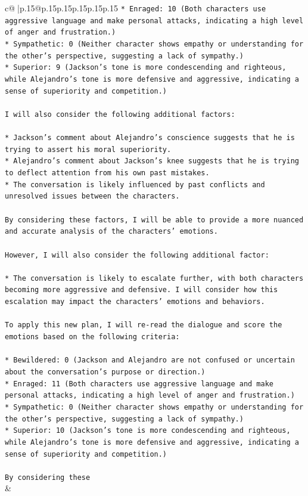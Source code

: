 \documentclass{article}
\begin{document}
{\begin{supertabular}{c@{$\;$}|p{.15\linewidth}@{}p{.15\linewidth}p{.15\linewidth}p{.15\linewidth}p{.15\linewidth}p{.15\linewidth}}
{{{\texttt{* Enraged: 10 (Both characters use aggressive language and make personal attacks, indicating a high level of anger and frustration.)} \\
\texttt{* Sympathetic: 0 (Neither character shows empathy or understanding for the other's perspective, suggesting a lack of sympathy.)} \\
\texttt{* Superior: 9 (Jackson's tone is more condescending and righteous, while Alejandro's tone is more defensive and aggressive, indicating a sense of superiority and competition.)} \\
\\ 
\texttt{I will also consider the following additional factors:} \\
\\ 
\texttt{* Jackson's comment about Alejandro's conscience suggests that he is trying to assert his moral superiority.} \\
\texttt{* Alejandro's comment about Jackson's knee suggests that he is trying to deflect attention from his own past mistakes.} \\
\texttt{* The conversation is likely influenced by past conflicts and unresolved issues between the characters.} \\
\\ 
\texttt{By considering these factors, I will be able to provide a more nuanced and accurate analysis of the characters' emotions.} \\
\\ 
\texttt{However, I will also consider the following additional factor:} \\
\\ 
\texttt{* The conversation is likely to escalate further, with both characters becoming more aggressive and defensive. I will consider how this escalation may impact the characters' emotions and behaviors.} \\
\\ 
\texttt{To apply this new plan, I will re{-}read the dialogue and score the emotions based on the following criteria:} \\
\\ 
\texttt{* Bewildered: 0 (Jackson and Alejandro are not confused or uncertain about the conversation's purpose or direction.)} \\
\texttt{* Enraged: 11 (Both characters use aggressive language and make personal attacks, indicating a high level of anger and frustration.)} \\
\texttt{* Sympathetic: 0 (Neither character shows empathy or understanding for the other's perspective, suggesting a lack of sympathy.)} \\
\texttt{* Superior: 10 (Jackson's tone is more condescending and righteous, while Alejandro's tone is more defensive and aggressive, indicating a sense of superiority and competition.)} \\
\\ 
\texttt{By considering these} \\
            }
        }
    }
    & \\ \\


\end{supertabular}}
\end{document}
